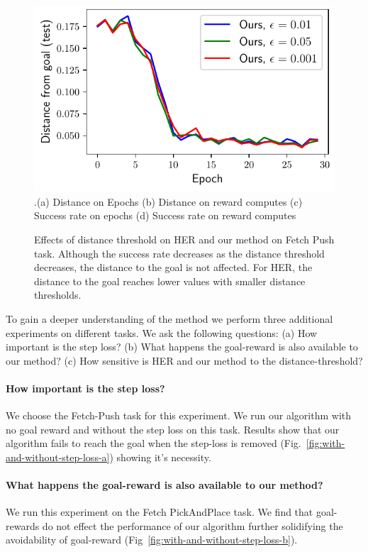 \begin{figure}
  \includegraphics[width=\frac\columnwidth]{media/res/ablate-ddpg-dqst-low_tresh_chosen-low_thresh_alt-dqst/0.001-FetchPushPR-be467dfepoch-test/ag_g_dist.pdf}%
  {.\tiny\color{blue}\hspace{0.8cm}(a) Distance on Epochs \hspace{1.05cm}(b) Distance on
    reward computes
    \hspace{0.70cm} (c) Success rate on epochs \hspace{0.9cm} (d) Success rate on reward computes}
  \caption{Effects of distance threshold on HER and our method on Fetch Push
task. Although the success rate decreases as the distance threshold decreases,
the distance to the goal is not affected. For HER, the distance to the goal
reaches lower values with smaller distance thresholds.}%
  \label{fig:with-different-distance-thresholds}%
\end{figure}%
% 

To gain a deeper understanding of the method we perform three additional
experiments on different tasks. We ask the following questions:
(a) How important is the step loss?
(b) What happens the goal-reward is also available to our method?
(c) How sensitive is HER and our method to the distance-threshold?
\paragraph{How important is the step loss?}
%
We choose the Fetch-Push task for this experiment.
We run our algorithm with no goal reward and without the step loss on
this task. Results show that our algorithm fails to reach the goal when the
step-loss is removed (Fig.~\ref{fig:with-and-without-step-loss-a})
showing it's necessity.

\paragraph{What happens the goal-reward is also available to our method?}
We run this experiment on the Fetch PickAndPlace task. We find that
goal-rewards do not effect the performance of our algorithm further
solidifying the avoidability of goal-reward
(Fig~\ref{fig:with-and-without-step-loss-b}).

